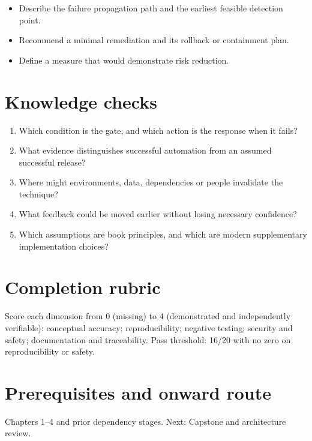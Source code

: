 \documentclass[10pt,letterpaper]{article}
\begin{document}
\begin{itemize}
\item Describe the failure propagation path and the earliest feasible detection point.
\item Recommend a minimal remediation and its rollback or containment plan.
\item Define a measure that would demonstrate risk reduction.
\end{itemize}

\section{Knowledge checks}
\begin{enumerate}
\item Which condition is the gate, and which action is the response when it fails?
\item What evidence distinguishes successful automation from an assumed successful release?
\item Where might environments, data, dependencies or people invalidate the technique?
\item What feedback could be moved earlier without losing necessary confidence?
\item Which assumptions are book principles, and which are modern supplementary implementation choices?
\end{enumerate}

\section{Completion rubric}
Score each dimension from 0 (missing) to 4 (demonstrated and independently verifiable): conceptual accuracy; reproducibility; negative testing; security and safety; documentation and traceability. Pass threshold: 16/20 with no zero on reproducibility or safety.


\section{Prerequisites and onward route}
Chapters 1--4 and prior dependency stages. Next: Capstone and architecture review.
\end{document}
